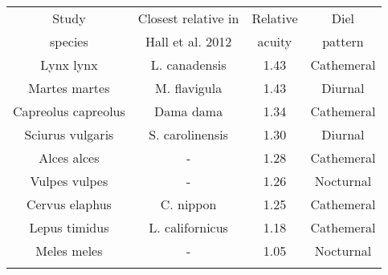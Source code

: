\begin{tabular}{cccc}
	\toprule
	Study & Closest relative in 	& Relative 	& Diel  \\	%
	species& Hall et al. 2012  		& acuity 	& pattern \\	%
	\midrule
	Lynx lynx & L. canadensis 			&1.43 	& Cathemeral \\	%
	Martes martes & M. flavigula 		&1.43 	& Diurnal 	\\	%
	Capreolus capreolus & Dama dama 	&1.34 	& Cathemeral \\	%
	Sciurus vulgaris & S. carolinensis	&1.30 	& Diurnal 	\\	%
	Alces alces & -  					&1.28 	& Cathemeral \\	%
	Vulpes vulpes & -				 	&1.26 	& Nocturnal \\	%
	Cervus elaphus & C. nippon 			&1.25 	& Cathemeral \\	%
	Lepus timidus & L. californicus 	&1.18 	& Cathemeral \\ %
	Meles meles & - 				 	&1.05 	& Nocturnal \\	%
	\bottomrule& 
\end{tabular}

